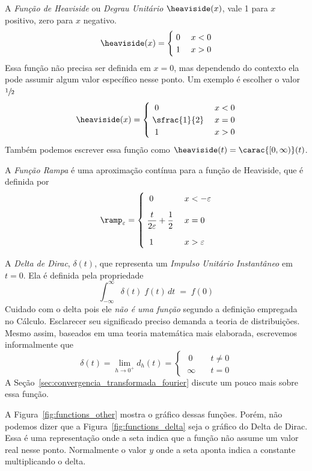 A \emph{Função de Heaviside}
ou \emph{Degrau Unitário}
$\heaviside(x)$, vale 1 para $x$ positivo, zero para $x$ negativo.
\begin{equation}
  \label{eq:funcao_heaviside}
  \heaviside(x) = \begin{cases}
    \; 0 & \; x < 0 \\
    \; 1 & \; x > 0
  \end{cases}
\end{equation}
Essa função não precisa ser definida em $x=0$, mas dependendo do contexto
ela pode assumir algum valor específico nesse ponto. Um exemplo é
escolher o valor $\sfrac{1}{2}$
\[
  \heaviside(x) = \begin{cases}
    \;\; 0          & \; x < 0 \\
    \; \sfrac{1}{2} & \; x = 0 \\
    \;\; 1          & \; x > 0
  \end{cases}
\]
Também podemos escrever essa função como \(\heaviside(t) = \carac{[0, \infty)}(t)\).

A \emph{Função Rampa} é uma aproximação contínua para a
função de Heaviside, que é definida por
\begin{equation}
  \label{eq:funcao_rampa}
  \ramp_\varepsilon = \begin{cases}
    \;\; 0                                 & \; x < - \varepsilon \\[3mm]
    \; \dfrac{t}{2\varepsilon} + \dfrac{1}{2} & \; x = 0          \\[4mm]
    \;\; 1                                 & \; x > \varepsilon
  \end{cases}
\end{equation}

A \emph{Delta de Dirac}, \(\delta(t)\),
que representa um \emph{Impulso Unitário Instantâneo}
em \(t=0\). Ela é definida pela propriedade
\begin{equation}
  \label{eq:delta_dirac}
  \int_{-\infty}^\infty \delta(t)\; f(t)\, dt \;=\; f(0)
\end{equation}
Cuidado com o delta pois ele \emph{não é uma função} segundo a definição empregada no Cálculo.
Esclarecer seu significado preciso demanda a teoria de distribuições.
Mesmo assim, baseados em uma teoria matemática mais elaborada, escrevemos
informalmente que
\[
  \delta(t) = \lim_{h\to 0^+} d_h(t) =
    \begin{cases}
      \;\, 0      & \quad t\neq 0 \\
      \;   \infty & \quad t = 0
    \end{cases}
\]
A Seção~\ref{sec:convergencia_transformada_fourier} discute um pouco mais sobre essa função.

A Figura~\ref{fig:functions_other} mostra o gráfico dessas funções.
Porém, não podemos dizer que a Figura~\ref{fig:functions_delta} seja o gráfico
do Delta de Dirac. Essa é uma representação onde a seta indica que a função não
assume um valor real nesse ponto. Normalmente o valor $y$ onde a seta aponta
indica a constante multiplicando o delta.

